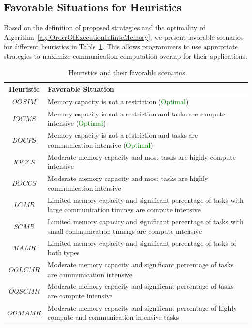 \documentclass[sigconf]{acmart}
\begin{document}
{		\subsection{Favorable Situations for Heuristics}
		Based on the definition of proposed strategies and the optimality of Algorithm~\ref{alg:OrderOfExecutionInfinteMemory}, we present favorable scenarios for different heuristics in Table~\ref{tab:heuristicsAndFavorableScenarios}. This allows programmers to use appropriate strategies to maximize communication-computation overlap for their applications.
		
		\begin{table}[htb]
			\begin{tabular}{|c|p{6.5cm}|}
				\hline
				\textbf{Heuristic} & \textbf{\hspace{2cm}Favorable Situation} \\ \hline
				$OOSIM$ & Memory capacity is not a restriction (\textcolor{green}{Optimal}) \\ \hline
				$IOCMS$ & Memory capacity is not a restriction and tasks are compute intensive (\textcolor{green}{Optimal}) \\ \hline
				$DOCPS$ & Memory capacity is not a restriction and tasks are communication intensive (\textcolor{green}{Optimal}) \\ \hline
				$IOCCS$ & Moderate memory capacity and most tasks are highly compute intensive \\ \hline
				$DOCCS$ & Moderate memory capacity and most tasks are highly communication intensive \\ \hline
				$LCMR$ & Limited memory capacity and significant percentage of tasks with large communication timings are compute intensive\\ \hline
				$SCMR$ & Limited memory capacity and significant percentage of tasks with small communication timings are compute intensive\\ \hline
				$MAMR$ & Limited memory capacity and significant percentage of tasks of both types\\ \hline
				$OOLCMR$ & Moderate memory capacity and significant percentage of tasks are communication intensive\\ \hline
				$OOSCMR$ & Moderate memory capacity and significant percentage of tasks are compute intensive \\ \hline
				$OOMAMR$ & Moderate memory capacity and significant percentage of highly compute and communication intensive tasks \\ \hline
			\end{tabular}\caption{~\label{tab:heuristicsAndFavorableScenarios}Heuristics and their favorable scenarios.}
		\end{table}
		
}
\end{document}
